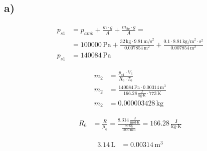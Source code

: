 

\subsection*{a)}

\begin{align*}
p_{s1} &= p_{amb} + \frac{m \cdot g}{A} + \frac{m_{2v} \cdot g}{A} = \\
&= 100000 \, \text{Pa} + \frac{32 \, \text{kg} \cdot 9.81 \, \text{m/s}^2}{0.007854 \, \text{m}^2} + \frac{0.1 \cdot 8.81 \, \text{kg/m}^2 \cdot \text{s}^2}{0.007854 \, \text{m}^2} \\
p_{s1} &= 140084 \, \text{Pa}
\end{align*}

\begin{align*}
m_2 &= \frac{p_{s1} \cdot V_6}{R_6 \cdot T_6} \\
m_2 &= \frac{140084 \, \text{Pa} \cdot 0.00314 \, \text{m}^3}{166.28 \, \frac{\text{J}}{\text{kg} \cdot \text{K}} \cdot 773 \, \text{K}} \\
m_2 &= 0.000003428 \, \text{kg}
\end{align*}

\begin{align*}
R_6 &= \frac{R}{\mu_6} = \frac{8.314 \, \frac{\text{J}}{\text{mol} \cdot \text{K}}}{\frac{56 \, \text{kg}}{1000 \, \text{mol}}} = 166.28 \, \frac{\text{J}}{\text{kg} \cdot \text{K}}
\end{align*}

\begin{align*}
3.14 \, \text{L} &= 0.00314 \, \text{m}^3
\end{align*}
